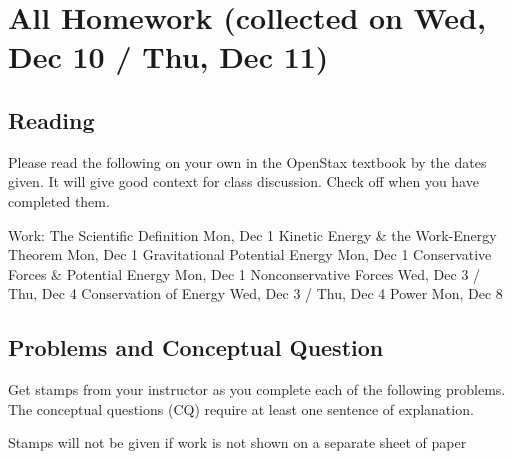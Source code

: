 \documentclass[10pt]{exam}
\title{\mytitle}
\author{Rohrbach}
\date{\today}
\begin{document}
\maketitle



\section*{All Homework (collected on Wed, Dec 10 / Thu, Dec 11)}



\subsection*{Reading}

Please read the following on your own in the OpenStax textbook by the dates given.  It will give good context for class discussion.  Check off when you have completed them.

\vspace{1em}

\begin{checkboxes}
   Work: The Scientific Definition \dotfill Mon, Dec 1
   Kinetic Energy \& the Work-Energy Theorem \dotfill Mon, Dec 1
   Gravitational Potential Energy \dotfill Mon, Dec 1
   Conservative Forces \& Potential Energy \dotfill Mon, Dec 1
   Nonconservative Forces \dotfill Wed, Dec 3 / Thu, Dec 4
   Conservation of Energy \dotfill Wed, Dec 3 / Thu, Dec 4
   Power \dotfill Mon, Dec 8
\end{checkboxes}


\subsection*{Problems and Conceptual Question}


Get stamps from your instructor as you complete each of the following problems.  The conceptual questions (CQ) require at least one sentence of explanation.

\vspace{1em}

\noindent
{\sc Stamps will not be given if work is not shown on a separate sheet of paper}

\vspace{1em}
\end{document}
